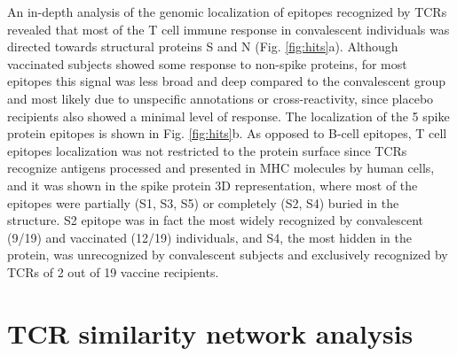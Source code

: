 An in-depth analysis of the genomic localization of \covid{} epitopes recognized by TCRs revealed that most of the T cell immune response in convalescent individuals was directed towards structural proteins S and N (Fig. \ref{fig:hits}a). Although vaccinated subjects showed some response to non-spike proteins, for most epitopes this signal was less broad and deep compared to the convalescent group and most likely due to unspecific annotations or cross-reactivity, since placebo recipients also showed a minimal level of response. The localization of the 5 spike protein epitopes is shown in Fig. \ref{fig:hits}b. As opposed to B-cell epitopes, T cell epitopes localization was not restricted to the protein surface since TCRs recognize antigens processed and presented in MHC molecules by human cells, and it was shown in the spike protein 3D representation, where most of the epitopes were partially (S1, S3, S5) or completely (S2, S4) buried in the structure. S2 epitope was in fact the most widely recognized by convalescent (9/19) and vaccinated (12/19) individuals, and S4, the most hidden in the protein, was unrecognized by convalescent subjects and exclusively recognized by TCRs of 2 out of 19 vaccine recipients.




\section*{TCR similarity network analysis}


